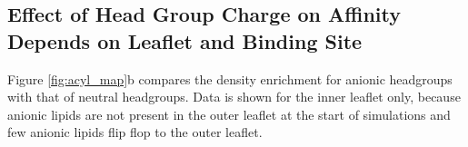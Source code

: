 \subsection{Effect of Head Group Charge on Affinity Depends on Leaflet and Binding Site}
Figure \ref{fig:acyl_map}b compares the density enrichment for anionic headgroups with that of neutral headgroups. Data is shown for the inner leaflet only, because anionic lipids are not present in the outer leaflet at the start of simulations and few anionic lipids flip flop to the outer leaflet.%

